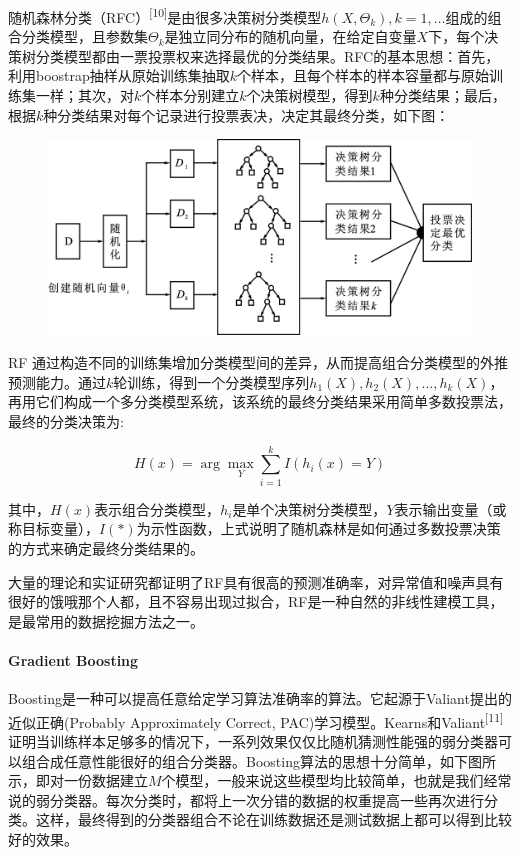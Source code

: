 \documentclass{article}
\begin{document}
随机森林分类（RFC）\textsuperscript{{[}10{]}}是由很多决策树分类模型\({h(X,\Theta_k),k=1,\ldots}\)组成的组合分类模型，且参数集\({\Theta_k}\)是独立同分布的随机向量，在给定自变量\(X\)下，每个决策树分类模型都由一票投票权来选择最优的分类结果。RFC的基本思想：首先，利用boostrap抽样从原始训练集抽取\(k\)个样本，且每个样本的样本容量都与原始训练集一样；其次，对\(k\)个样本分别建立\(k\)个决策树模型，得到\(k\)种分类结果；最后，根据\(k\)种分类结果对每个记录进行投票表决，决定其最终分类，如下图：

\begin{figure}[htbp]
\centering
\includegraphics{./images/rfc.jpg}
\caption{}
\end{figure}

RF
通过构造不同的训练集增加分类模型间的差异，从而提高组合分类模型的外推预测能力。通过\(k\)轮训练，得到一个分类模型序列\({h_1(X),h_2(X),\ldots,h_k(X)}\)，再用它们构成一个多分类模型系统，该系统的最终分类结果采用简单多数投票法，最终的分类决策为:

\[
H(x)=\arg\max_Y\sum_{i=1}^kI(h_i(x)=Y)
\]

其中，\(H(x)\)表示组合分类模型，\(h_i\)是单个决策树分类模型，\(Y\)表示输出变量（或称目标变量），\(I(*)\)为示性函数，上式说明了随机森林是如何通过多数投票决策的方式来确定最终分类结果的。

大量的理论和实证研究都证明了RF具有很高的预测准确率，对异常值和噪声具有很好的饿哦那个人都，且不容易出现过拟合，RF是一种自然的非线性建模工具，是最常用的数据挖掘方法之一。

\paragraph{Gradient Boosting}\label{gradient-boosting}

Boosting是一种可以提高任意给定学习算法准确率的算法。它起源于Valiant提出的近似正确(Probably
Approximately Correct,
PAC)学习模型。Kearns和Valiant\textsuperscript{{[}11{]}}证明当训练样本足够多的情况下，一系列效果仅仅比随机猜测性能强的弱分类器可以组合成任意性能很好的组合分类器。Boosting算法的思想十分简单，如下图所示，即对一份数据建立\(M\)个模型，一般来说这些模型均比较简单，也就是我们经常说的弱分类器。每次分类时，都将上一次分错的数据的权重提高一些再次进行分类。这样，最终得到的分类器组合不论在训练数据还是测试数据上都可以得到比较好的效果。
\end{document}
